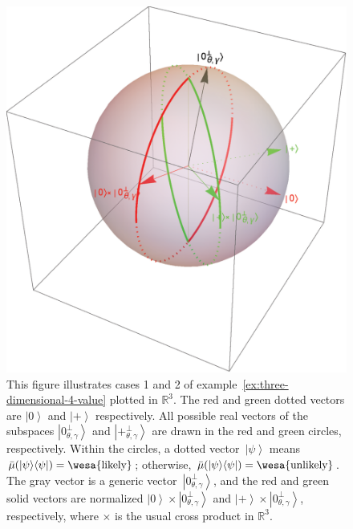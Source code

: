 \documentclass[12pt]{iopart}
\theoremstyle{remark}
\newcommand{\likely}{{\mbox{\wesa{likely}}}}
\newcommand{\unlikely}{{\mbox{\wesa{unlikely}}}}
\newcommand{\ket}[1]{{\left\vert{#1}\right\rangle}}
\newcommand{\op}[2]{\ensuremath{\left\vert{#1}\middle\rangle\middle\langle{#2}\right\vert}}
\newcommand{\proj}[1]{\op{#1}{#1}}
\newcommand{\ps}{\texttt{+}}
\begin{document}
\begin{figure}
\begin{centering}
\includegraphics[scale=0.38]{figure2} 
\par\end{centering}
\caption{\label{fig:three-dimensional-4-value}This figure illustrates cases
1 and 2 of example~\ref{ex:three-dimensional-4-value} plotted in
$\mathbb{R}^{3}$. The red and green dotted vectors are $\ket{0}$
and $\ket{\ps}$ respectively. All possible real vectors of the subspaces
$\ket{0_{\theta,\gamma}^{\perp}}$ and $\ket{\ps_{\theta,\gamma}^{\perp}}$
are drawn in the red and green circles, respectively. Within the circles,
a dotted vector~$\ket{\psi}$ means $\bar{\mu}(\proj{\psi})=\likely$;
otherwise, $\bar{\mu}(\proj{\psi})=\unlikely$. The gray vector is
a generic vector~$\ket{0_{\theta,\gamma}^{\perp}}$, and the red
and green solid vectors are normalized $\ket{0}\times\ket{0_{\theta,\gamma}^{\perp}}$
and $\ket{\ps}\times\ket{0_{\theta,\gamma}^{\perp}}$, respectively,
where $\times$ is the usual cross product in $\mathbb{R}^{3}$.}
\end{figure}
\end{document}
